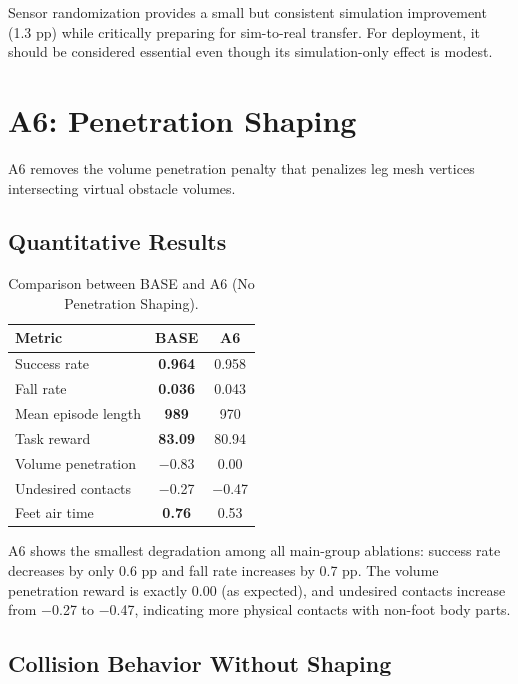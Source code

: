 Sensor randomization provides a small but consistent simulation improvement (1.3 pp) while critically preparing for sim-to-real transfer. For deployment, it should be considered essential even though its simulation-only effect is modest.

\section{A6: Penetration Shaping}
\label{sec:ablation_penetration}

A6 removes the volume penetration penalty that penalizes leg mesh vertices intersecting virtual obstacle volumes.

\subsection{Quantitative Results}

\begin{table}[t]
\centering
\caption{Comparison between BASE and A6 (No Penetration Shaping).}
\label{tab:a6_results}
\begin{tabular}{lcc}
\toprule
\textbf{Metric} & \textbf{BASE} & \textbf{A6} \\
\midrule
Success rate & \textbf{0.964} & 0.958 \\
Fall rate & \textbf{0.036} & 0.043 \\
Mean episode length & \textbf{989} & 970 \\
Task reward & \textbf{83.09} & 80.94 \\
Volume penetration & $-$0.83 & 0.00 \\
Undesired contacts & $-$0.27 & $-$0.47 \\
Feet air time & \textbf{0.76} & 0.53 \\
\bottomrule
\end{tabular}
\end{table}

A6 shows the smallest degradation among all main-group ablations: success rate decreases by only 0.6 pp and fall rate increases by 0.7 pp. The volume penetration reward is exactly 0.00 (as expected), and undesired contacts increase from $-$0.27 to $-$0.47, indicating more physical contacts with non-foot body parts.

\subsection{Collision Behavior Without Shaping}


